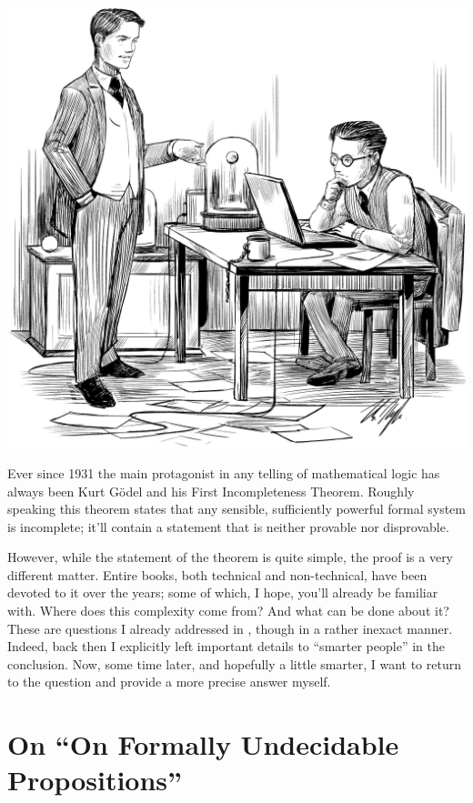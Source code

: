 \documentclass{article}
\theoremstyle{customstyle}
\begin{document}
\begin{center}
  \includegraphics[scale=0.115]{cover.jpg}
\end{center}

Ever since 1931 the main protagonist in any telling of mathematical logic has always been Kurt Gödel and his First Incompleteness Theorem. Roughly speaking this theorem states that any sensible, sufficiently powerful formal system is incomplete; it'll contain a statement that is neither provable nor disprovable.

However, while the statement of the theorem is quite simple, the proof is a very different matter. Entire books, both technical and non-technical, have been devoted to it over the years; some of which, I hope, you'll already be familiar with. Where does this complexity come from? And what can be done about it? These are questions I already addressed in \cite{oberhoff}, though in a rather inexact manner. Indeed, back then I explicitly left important details to ``smarter people'' in the conclusion. Now, some time later, and hopefully a little smarter, I want to return to the question and provide a more precise answer myself.

\section{On ``On Formally Undecidable Propositions''}
\end{document}
